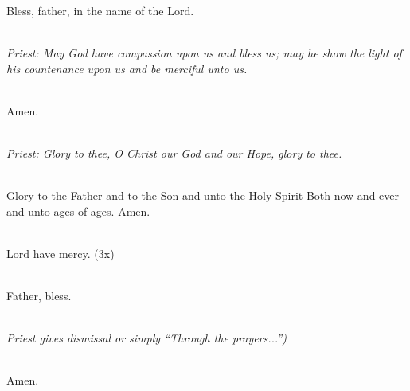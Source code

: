 \mbox{}\\
\lhmTwelve

\mbox{}\\
\morehonorablethanthetherubim

\mbox{}\\
Bless, father, in the name of the Lord.

\mbox{}\\
\emph{Priest: May God have compassion upon us and bless us;
may he show the light of his countenance upon us and be merciful unto us.}

\mbox{}\\
Amen.

\mbox{}\\
\emph{Priest: Glory to thee,
O Christ our God and our Hope, glory to thee.}

\mbox{}\\
Glory to the Father and to the Son and unto the Holy Spirit
Both now and ever and unto ages of ages. Amen.

\mbox{}\\
Lord have mercy. (3x)

\mbox{}\\
Father, bless.

\mbox{}\\
\emph{Priest gives dismissal or simply ``Through the prayers...'')}

\mbox{}\\
Amen.
